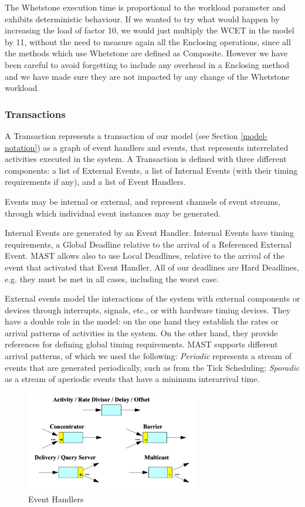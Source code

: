 \documentclass{article}
\begin{document}
The Whetstone execution time is proportional to the workload parameter and exhibits deterministic behaviour. If we wanted to try what would happen by increasing the load of factor 10, we would just multiply the WCET in the model by 11, without the need to measure again all the Enclosing operations, since all the methods which use Whetstone are defined as Composite. However we have been careful to avoid forgetting to include any overhead in a Enclosing method and we have made sure they are not impacted by any change of the Whetstone workload.

\subsubsection{Transactions}

A Transaction represents a transaction of our model (see Section \ref{model-notation}) as a graph of event handlers and events, that represents interrelated activities executed in the system. A Transaction is defined with three different components: a list of External Events, a list of Internal Events (with their timing requirements if any), and a list of Event Handlers.

Events may be internal or external, and represent channels of event streams, through which individual event instances may be generated.

Internal Events are generated by an Event Handler. Internal Events have timing requirements, a Global Deadline relative to the arrival of a Referenced External Event. MAST allows also to use Local Deadlines, relative to the arrival of the event that activated that Event Handler. All of our deadlines are Hard Deadlines, e.g. they must be met in all cases, including the worst case.

External events model the interactions of the system with external components or devices through interrupts, signals, etc., or with hardware timing devices. They have a double role in the model: on the one hand they establish the rates or arrival patterns of activities in the system. On the other hand, they provide references for defining global timing requirements. MAST supports different arrival patterns, of which we used the following: \textit{Periodic} represents a stream of events that are generated periodically, such as from the Tick Scheduling; \textit{Sporadic} as a stream of aperiodic events that have a minimum interarrival time.

\begin{figure}[!htbp]
\centering
\includegraphics[width=3in]{images/event-handlers}
\caption{Event Handlers}
\label{event-handlers}
\end{figure}
\end{document}
